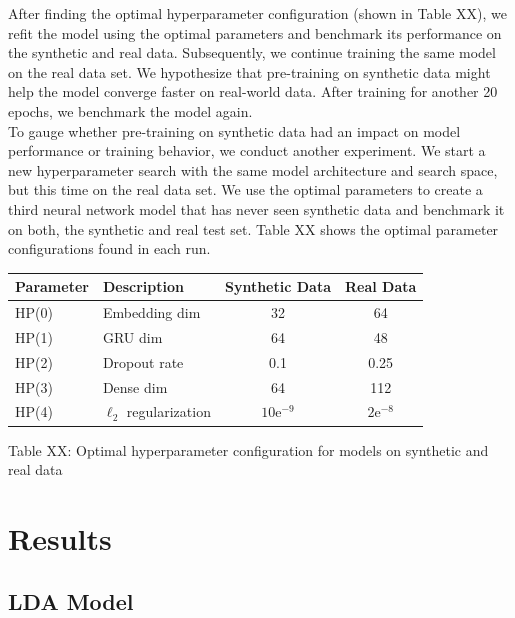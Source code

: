 \documentclass[11pt]{article}
\begin{document}
\noindent After finding the optimal hyperparameter configuration (shown in Table XX), we refit the model using the optimal parameters and benchmark its performance on the synthetic and real data. Subsequently, we continue training the same model on the real data set. We hypothesize that pre-training on synthetic data might help the model converge faster on real-world data. After training for another 20 epochs, we benchmark the model again.
\\[5pt]
\noindent To gauge whether pre-training on synthetic data had an impact on model performance or training behavior, we conduct another experiment. We start a new hyperparameter search with the same model architecture and search space, but this time on the real data set. We use the optimal parameters to create a third neural network model that has never seen synthetic data and benchmark it on both, the synthetic and real test set. Table XX shows the optimal parameter configurations found in each run.


\begin{center}
\begin{tabular}{llcc}
\toprule
    Parameter & Description & Synthetic Data & Real Data \\
\midrule
    HP(0) & Embedding dim & 32 & 64\\
    HP(1) & GRU dim & 64 & 48\\
    HP(2) & Dropout rate & 0.1 & 0.25\\
    HP(3) & Dense dim & 64 & 112\\
    HP(4) & $\ell_2$ regularization & $10\mathrm{e}^{-9}$ & $2\mathrm{e}^{-8}$\\
\bottomrule
\end{tabular}
\end{center}
\begin{center}
	Table XX: Optimal hyperparameter configuration for models on synthetic and real data
\end{center}




\section{Results}
\subsection{LDA Model}
\end{document}
